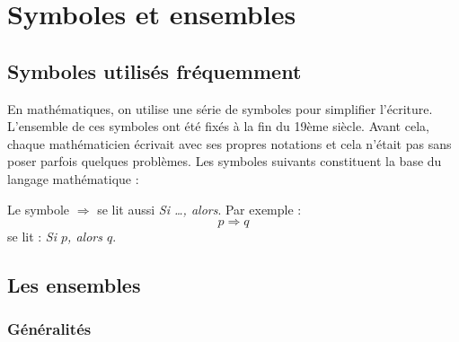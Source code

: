 \chapter{Symboles et ensembles}
\section{Symboles utilisés fréquemment}

En mathématiques, on utilise une série de symboles pour simplifier l'écriture. L'ensemble de ces symboles ont été fixés à la fin du 19ème siècle. Avant cela, chaque mathématicien écrivait avec ses propres notations et cela n'était pas sans poser parfois quelques problèmes. Les symboles suivants  constituent la base du langage mathématique :

\vspace*{0.5cm}

\vspace*{0.5cm}



\begin{remarque}
Le symbole $\Rightarrow$ se lit aussi \emph{Si \dots, alors}. Par exemple :
$$
p\Rightarrow q
$$
se lit : \emph{Si $p$, alors $q$}.
\end{remarque}
\newpage
\section{Les ensembles}

\subsection{Généralités}

